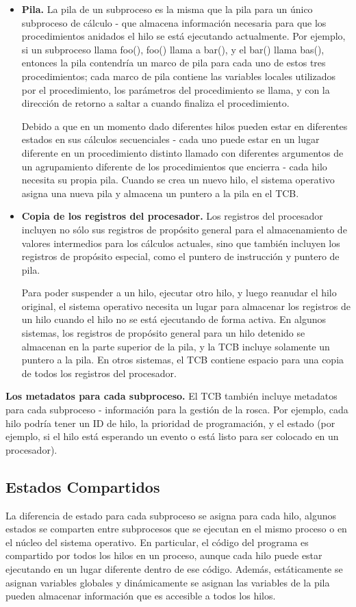 \documentclass[10pt]{book}
\begin{document}
\begin{itemize}
\item \textbf{Pila.} La pila de un subproceso es la misma que la pila para un único subproceso de cálculo - que almacena información necesaria para que los procedimientos anidados el hilo se está ejecutando actualmente. Por ejemplo, si un subproceso llama foo(), foo() llama a bar(), y el bar() llama bas(), entonces la pila contendría un marco de pila para cada uno de estos tres procedimientos; cada marco de pila contiene las variables locales utilizados por el procedimiento, los parámetros del procedimiento se llama, y con la dirección de retorno a saltar a cuando finaliza el procedimiento.

Debido a que en un momento dado diferentes hilos pueden estar en diferentes estados en sus cálculos secuenciales - cada uno puede estar en un lugar diferente en un procedimiento distinto llamado con diferentes argumentos de un agrupamiento diferente de los procedimientos que encierra - cada hilo necesita su propia pila. Cuando se crea un nuevo hilo, el sistema operativo asigna una nueva pila y almacena un puntero a la pila en el TCB.

\item \textbf{Copia de los registros del procesador.} Los registros del procesador incluyen no sólo sus registros de propósito general para el almacenamiento de valores intermedios para los cálculos actuales, sino que también incluyen los registros de propósito especial, como el puntero de instrucción y puntero de pila.

Para poder suspender a un hilo, ejecutar otro hilo, y luego reanudar el hilo original, el sistema operativo necesita un lugar para almacenar los registros de un hilo cuando el hilo no se está ejecutando de forma activa. En algunos sistemas, los registros de propósito general para un hilo detenido se almacenan en la parte superior de la pila, y la TCB incluye solamente un puntero a la pila. En otros sistemas, el TCB contiene espacio para una copia de todos los registros del procesador.
\end{itemize}

\textbf{Los metadatos para cada subproceso.} El TCB también incluye metadatos para cada subproceso - información para la gestión de la rosca. Por ejemplo, cada hilo podría tener un ID de hilo, la prioridad de programación, y el estado (por ejemplo, si el hilo está esperando un evento o está listo para ser colocado en un procesador).

\subsection{Estados Compartidos}
La diferencia de estado para cada subproceso se asigna para cada hilo, algunos estados se comparten entre subprocesos que se ejecutan en el mismo proceso o en el núcleo del sistema operativo. En particular, el código del programa es compartido por todos los hilos en un proceso, aunque cada hilo puede estar ejecutando en un lugar diferente dentro de ese código. Además, estáticamente se asignan variables globales y dinámicamente se asignan las variables de la pila pueden almacenar información que es accesible a todos los hilos.
\end{document}
